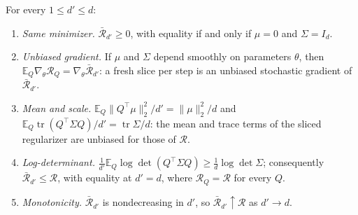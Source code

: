 \begin{proposition}[Slicing]
\label{prop:slicing}
For every $1\le d'\le d$:
\begin{enumerate}[leftmargin=*]
\item[(i)] \emph{Same minimizer.} $\bar{\mathcal R}_{d'}\ge0$, with equality if and only if $\mu=0$ and $\Sigma=I_d$.
\item[(ii)] \emph{Unbiased gradient.} If $\mu$ and $\Sigma$ depend smoothly on parameters $\theta$, then $\mathbb E_Q\nabla_\theta\mathcal R_Q=\nabla_\theta\bar{\mathcal R}_{d'}$: a fresh slice per step is an unbiased stochastic gradient of $\bar{\mathcal R}_{d'}$.
\item[(iii)] \emph{Mean and scale.} $\mathbb E_Q\|Q^\top\mu\|_2^2/d'=\|\mu\|_2^2/d$ and $\mathbb E_Q\operatorname{tr}(Q^\top\Sigma Q)/d'=\operatorname{tr}\Sigma/d$: the mean and trace terms of the sliced regularizer are unbiased for those of $\mathcal R$.
\item[(iv)] \emph{Log-determinant.} $\frac{1}{d'}\mathbb E_Q\log\det(Q^\top\Sigma Q)\ge\frac{1}{d}\log\det\Sigma$; consequently $\bar{\mathcal R}_{d'}\le\mathcal R$, with equality at $d'=d$, where $\mathcal R_Q=\mathcal R$ for every $Q$.
\item[(v)] \emph{Monotonicity.} $\bar{\mathcal R}_{d'}$ is nondecreasing in $d'$, so $\bar{\mathcal R}_{d'}\uparrow\mathcal R$ as $d'\to d$.
\end{enumerate}
\end{proposition}

